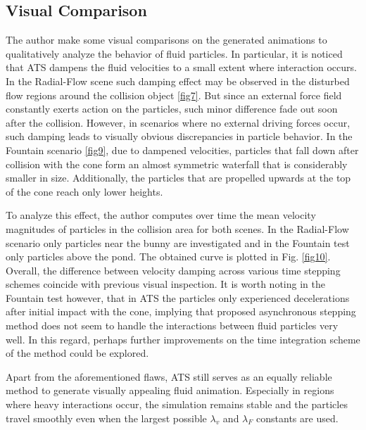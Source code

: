 \documentclass[
	11pt, 
	DIV10,
	ngerman,
	a4paper, 
	oneside, 
	headings=normal, 
	captions=tableheading,
	final, 
	numbers=noenddot
]{scrartcl}
\begin{document}
\subsection{Visual Comparison}
The author make some visual comparisons on the generated animations to qualitatively analyze the behavior of fluid particles. In particular, it is noticed that ATS dampens the fluid velocities to a small extent where interaction occurs. In the Radial-Flow scene such damping effect may be observed in the disturbed flow regions around the collision object \ref{fig7}. But since an external force field constantly exerts action on the particles, such minor difference fade out soon after the collision. However, in scenarios where no external driving forces occur, such damping leads to visually obvious discrepancies in particle behavior. In the Fountain scenario \ref{fig9}, due to dampened velocities, particles that fall down after collision with the cone form an almost symmetric waterfall that is considerably smaller in size. Additionally, the particles that are propelled upwards at the top of the cone reach only lower heights.
\par
To analyze this effect, the author computes over time the mean velocity magnitudes of particles in the collision area for both scenes. In the Radial-Flow scenario only particles near the bunny are investigated and in the Fountain test only particles above the pond. The obtained curve is plotted in Fig. \ref{fig10}. Overall, the difference between velocity damping across various time stepping schemes coincide with previous visual inspection. It is worth noting in the Fountain test however, that in ATS the particles only experienced decelerations after initial impact with the cone, implying that proposed asynchronous stepping method does not seem to handle the interactions between fluid particles very well. In this regard, perhaps further improvements on the time integration scheme of the method could be explored.
\par
Apart from the aforementioned flaws, ATS still serves as an equally reliable method to generate visually appealing fluid animation. Especially in regions where heavy interactions occur, the simulation remains stable and the particles travel smoothly even when the largest possible $ \lambda_{v} $ and $ \lambda_{F} $ constants are used.
\end{document}
